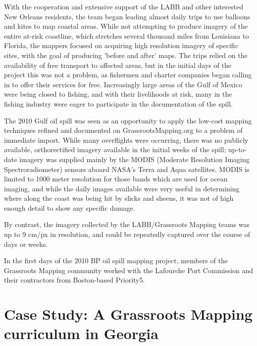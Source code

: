 \documentclass[11pt]{report}
\begin{document}
With the cooperation and extensive support of the LABB and other interested New Orleans residents, the team began leading almost daily trips to use balloons and kites to map coastal areas. While not attempting to produce imagery of the entire at-risk coastline, which stretches several thousand miles from Louisiana to Florida, the mappers focused on acquiring high resolution imagery of specific sites, with the goal of producing 'before and after' maps. The trips relied on the availability of free transport to affected areas, but in the initial days of the project this was not a problem, as fishermen and charter companies began calling in to offer their services for free. Increasingly large areas of the Gulf of Mexico were being closed to fishing, and with their livelihoods at risk, many in the fishing industry were eager to participate in the documentation of the spill. 


The 2010 Gulf oil spill was seen as an opportunity to apply the low-cost mapping techniques refined and documented on GrassrootsMapping.org to a problem of immediate import. While many overflights were occurring, there was no publicly available, orthorectified imagery available in the initial weeks of the spill; up-to-date imagery was supplied mainly by the MODIS (Moderate Resolution Imaging Spectroradiometer) sensors aboard NASA's Terra and Aqua satellites. MODIS is limited to 1000 meter resolution for those bands which are used for ocean imaging, and while the daily images available were very useful in determining where along the coast was being hit by slicks and sheens, it was not of high enough detail to show any specific damage. 


By contrast, the imagery collected by the LABB/Grassroots Mapping teams was up to 9 cm/px in resolution, and could be repeatedly captured over the course of days or weeks.  

In the first days of the 2010 BP oil spill mapping project, members of the Grassroots Mapping community worked with the Lafourche Port Commission and their contractors from Boston-based Priority5. 

\chapter{Case Study: A Grassroots Mapping curriculum in Georgia}
\end{document}
